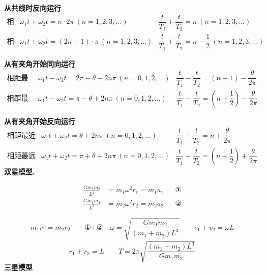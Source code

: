 \textbf{从共线时反向运行}
\[
\begin{array}{lll}
\text{相距最近} & \omega_1t+\omega_2t=n\cdot2\pi\ (n=1,2,3,\ldots) & \dfrac{t}{T_1}+\dfrac{t}{T_2}=n\ (n=1,2,3,\ldots)\\[10pt]
\text{相距最远} & \omega_1t+\omega_2t=(2n-1)\cdot\pi\ (n=1,2,3,\ldots) & \dfrac{t}{T_1}+\dfrac{t}{T_2}=n-\dfrac{1}{2}\ (n=1,2,3,\ldots)
\end{array}
\]

\textbf{从有夹角开始同向运行}
\[
\begin{array}{lll}
\text{相距最近} & \omega_1t-\omega_2t=2\pi-\theta+2n\pi\ (n=0,1,2,\ldots) & \dfrac{t}{T_1}-\dfrac{t}{T_2}=(n+1)-\dfrac{\theta}{2\pi}\\[10pt]
\text{相距最远} & \omega_1t-\omega_2t=\pi-\theta+2n\pi\ (n=0,1,2,\ldots) & \dfrac{t}{T_1}-\dfrac{t}{T_2}=\left(n+\dfrac{1}{2}\right)-\dfrac{\theta}{2\pi}
\end{array}
\]

\textbf{从有夹角开始反向运行}%
\[
\begin{array}{lll}
\text{相距最近} & \omega_1t+\omega_2t=\theta+2n\pi\ (n=0,1,2,\ldots) & \dfrac{t}{T_1}+\dfrac{t}{T_2}=n+\dfrac{\theta}{2\pi}\\[10pt]
\text{相距最远} & \omega_1t+\omega_2t=\pi+\theta+2n\pi\ (n=0,1,2,\ldots) & \dfrac{t}{T_1}+\dfrac{t}{T_2}=\left(n+\dfrac{1}{2}\right)+\dfrac{\theta}{2\pi}
\end{array}
\]
\textbf{双星模型.}


\begin{align*}
\frac{Gm_1m_2}{L^{2}}&=m_1\omega^{2}r_1=m_1a_1 &&\text{①}\\
\frac{Gm_1m_2}{L^{2}}&=m_2\omega^{2}r_2=m_2a_2 &&\text{②}
\end{align*}

\[
m_1r_1=m_2r_2\qquad \text{①+②}\quad \omega=\sqrt{\frac{Gm_1m_2}{(m_1+m_2)L^{3}}}\qquad v_1+v_2=\omega L
\]
\[
r_1+r_2=L\qquad T=2\pi\sqrt{\frac{(m_1+m_2)L^{3}}{Gm_1m_2}}
\]
\textbf{三星模型}

